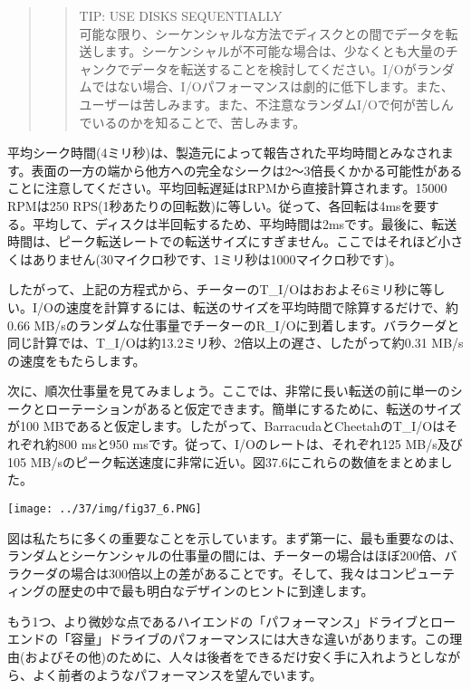 \begin{quote}
\begin{quote}
TIP: USE DISKS SEQUENTIALLY\\
可能な限り、シーケンシャルな方法でディスクとの間でデータを転送します。シーケンシャルが不可能な場合は、少なくとも大量のチャンクでデータを転送することを検討してください。I/Oがランダムではない場合、I/Oパフォーマンスは劇的に低下します。また、ユーザーは苦しみます。また、不注意なランダムI/Oで何が苦しんでいるのかを知ることで、苦しみます。
\end{quote}
\end{quote}

平均シーク時間(4ミリ秒)は、製造元によって報告された平均時間とみなされます。表面の一方の端から他方への完全なシークは2〜3倍長くかかる可能性があることに注意してください。平均回転遅延はRPMから直接計算されます。15000
RPMは250
RPS(1秒あたりの回転数)に等しい。従って、各回転は4msを要する。平均して、ディスクは半回転するため、平均時間は2msです。最後に、転送時間は、ピーク転送レートでの転送サイズにすぎません。ここではそれほど小さくはありません(30マイクロ秒です、1ミリ秒は1000マイクロ秒です)。

したがって、上記の方程式から、チーターのT\_I/Oはおおよそ6ミリ秒に等しい。I/Oの速度を計算するには、転送のサイズを平均時間で除算するだけで、約0.66
MB/sのランダムな仕事量でチーターのR\_I/Oに到着します。バラクーダと同じ計算では、T\_I/Oは約13.2ミリ秒、2倍以上の遅さ、したがって約0.31
MB/sの速度をもたらします。

次に、順次仕事量を見てみましょう。ここでは、非常に長い転送の前に単一のシークとローテーションがあると仮定できます。簡単にするために、転送のサイズが100
MBであると仮定します。したがって、BarracudaとCheetahのT\_I/Oはそれぞれ約800
msと950 msです。従って、I/Oのレートは、それぞれ125 MB/s及び105
MB/sのピーク転送速度に非常に近い。図37.6にこれらの数値をまとめました。

\texttt{[image: ../37/img/fig37\_6.PNG]}

図は私たちに多くの重要なことを示しています。まず第一に、最も重要なのは、ランダムとシーケンシャルの仕事量の間には、チーターの場合はほぼ200倍、バラクーダの場合は300倍以上の差があることです。そして、我々はコンピューティングの歴史の中で最も明白なデザインのヒントに到達します。

もう1つ、より微妙な点であるハイエンドの「パフォーマンス」ドライブとローエンドの「容量」ドライブのパフォーマンスには大きな違いがあります。この理由(およびその他)のために、人々は後者をできるだけ安く手に入れようとしながら、よく前者のようなパフォーマンスを望んでいます。

